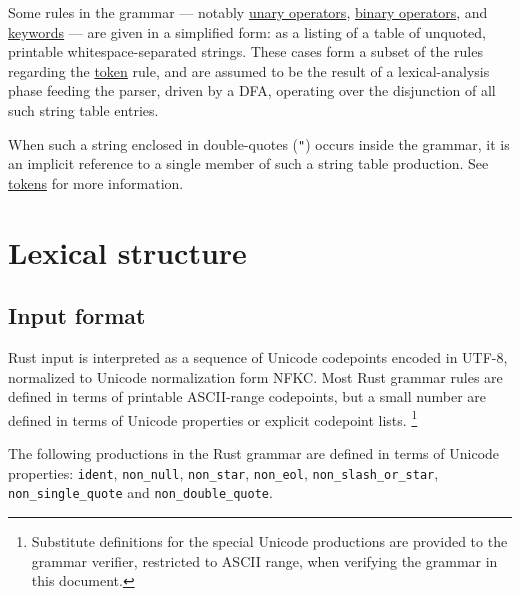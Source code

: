 \documentclass[]{article}
\begin{document}
Some rules in the grammar --- notably
\hyperref[unary-operator-expressions]{unary operators},
\hyperref[binary-operator-expressions]{binary operators}, and
\hyperref[keywords]{keywords} --- are given in a simplified form: as a
listing of a table of unquoted, printable whitespace-separated strings.
These cases form a subset of the rules regarding the
\hyperref[tokens]{token} rule, and are assumed to be the result of a
lexical-analysis phase feeding the parser, driven by a DFA, operating
over the disjunction of all such string table entries.

When such a string enclosed in double-quotes (\texttt{"}) occurs inside
the grammar, it is an implicit reference to a single member of such a
string table production. See \hyperref[tokens]{tokens} for more
information.

\section{Lexical structure}\label{lexical-structure}

\subsection{Input format}\label{input-format}

Rust input is interpreted as a sequence of Unicode codepoints encoded in
UTF-8, normalized to Unicode normalization form NFKC. Most Rust grammar
rules are defined in terms of printable ASCII-range codepoints, but a
small number are defined in terms of Unicode properties or explicit
codepoint lists. \footnote{Substitute definitions for the special
  Unicode productions are provided to the grammar verifier, restricted
  to ASCII range, when verifying the grammar in this document.}


The following productions in the Rust grammar are defined in terms of
Unicode properties: \texttt{ident}, \texttt{non\_null},
\texttt{non\_star}, \texttt{non\_eol}, \texttt{non\_slash\_or\_star},
\texttt{non\_single\_quote} and \texttt{non\_double\_quote}.

\end{document}
